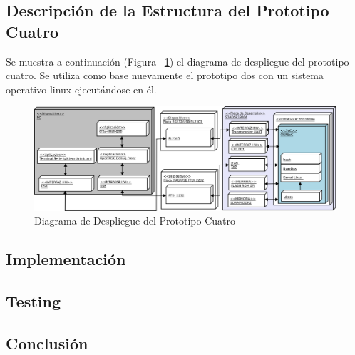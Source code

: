 		\subsection{Descripción de la Estructura del Prototipo Cuatro}
		Se muestra a continuación (Figura ~\ref{fig:proto4}) el diagrama de despliegue del prototipo cuatro. Se utiliza como base nuevamente el prototipo
		dos con un sistema operativo linux ejecutándose en él.

		\begin{figure}[h!]
 		\begin{center}
  		\includegraphics[width=1\textwidth,keepaspectratio=true]{./images/proto4}
  		\caption{Diagrama de Despliegue del Prototipo Cuatro}
  		\label{fig:proto4} 
 		\end{center}
		\end{figure}
	
		\newpage

		\subsection{Implementación}	
		
		\subsection{Testing}
		
		\subsection{Conclusión}
